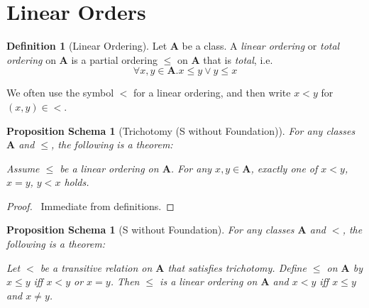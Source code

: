 \documentclass{book}
\let\qed\relax
\newtheorem{props}[ax]{Proposition Schema}
\theoremstyle{definition}
\newtheorem{df}[ax]{Definition}
\begin{document}
\section{Linear Orders}

\begin{df}[Linear Ordering]
Let $\mathbf{A}$ be a class. A \emph{linear ordering} or \emph{total ordering} on $\mathbf{A}$ is a partial ordering $\leq$ on $\mathbf{A}$ that is \emph{total}, i.e.
\[ \forall x,y \in \mathbf{A}. x \leq y \vee y \leq x \]

We often use the symbol $<$ for a linear ordering, and then write $x < y$ for $(x,y) \in <$.
\end{df}

\begin{props}[Trichotomy (S without Foundation)]
For any classes $\mathbf{A}$ and $\leq$, the following is a theorem:

Assume $\leq$ be a linear ordering on $\mathbf{A}$. For any $x,y \in \mathbf{A}$, exactly one of $x < y$, $x = y$, $y < x$ holds.
\end{props}

\begin{proof}
\pf\ Immediate from definitions. \qed
\end{proof}

\begin{props}[S without Foundation]
\label{prop:linord}
For any classes $\mathbf{A}$ and $<$, the following is a theorem:

Let $<$ be a transitive relation on $\mathbf{A}$ that satisfies trichotomy. Define $\leq$ on $\mathbf{A}$ by $x \leq y$ iff $x < y$ or $x = y$. Then $\leq$ is a linear ordering on $\mathbf{A}$ and $x < y$ iff $x \leq y$ and $x \neq y$.
\end{props}
\end{document}
